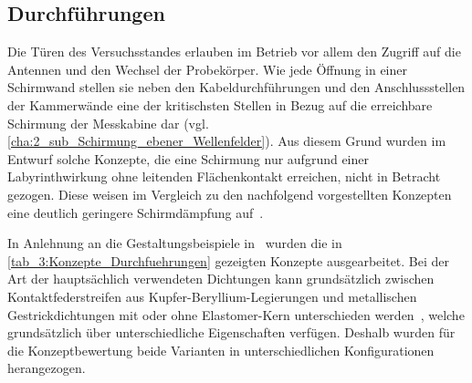 



\subsection{Durchführungen}\label{cha:3_sub_Durchfuehrungen}

Die Türen des Versuchsstandes erlauben im Betrieb vor allem den Zugriff auf die Antennen und den Wechsel der Probekörper. Wie jede Öffnung in einer Schirmwand stellen sie neben den Kabeldurchführungen und den Anschlussstellen der Kammerwände eine der kritischsten Stellen in Bezug auf die erreichbare Schirmung der Messkabine dar (vgl. \Abschnitt\ref{cha:2_sub_Schirmung_ebener_Wellenfelder}). Aus diesem Grund wurden im Entwurf solche Konzepte, die eine Schirmung nur aufgrund einer Labyrinthwirkung ohne leitenden Flächenkontakt erreichen, nicht in Betracht gezogen. Diese weisen im Vergleich zu den nachfolgend vorgestellten Konzepten eine deutlich geringere Schirmdämpfung auf~\cite{Design_of_shielded_enclosures}.
\par
\vspace{\linespace}
In Anlehnung an die Gestaltungsbeispiele in~\cite{EM_Schirmung, Design_of_shielded_enclosures} wurden die in \Tabelle\ref{tab_3:Konzepte_Durchfuehrungen} gezeigten Konzepte ausgearbeitet. Bei der Art der hauptsächlich verwendeten Dichtungen kann grundsätzlich zwischen Kontaktfederstreifen aus Kupfer-Beryllium-Legierungen und metallischen Gestrickdichtungen mit oder ohne Elastomer-Kern unterschieden werden~\cite{EM_Schirmung}, welche grundsätzlich über unterschiedliche Eigenschaften verfügen. Deshalb wurden für die Konzeptbewertung beide Varianten in unterschiedlichen Konfigurationen herangezogen.



